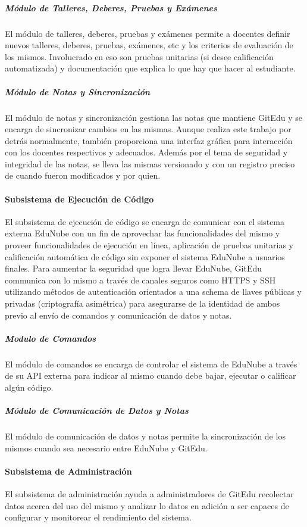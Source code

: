 \subparagraph{Módulo de Talleres, Deberes, Pruebas y Exámenes}
El módulo de talleres, deberes, pruebas y exámenes permite a docentes definir nuevos talleres, deberes, pruebas, exámenes, etc y los criterios de evaluación de los mismos. Involucrado en eso son pruebas unitarias (si desee calificación automatizada) y documentación que explica lo que hay que hacer al estudiante.

\subparagraph{Módulo de Notas y Sincronización}
El módulo de notas y sincronización gestiona las notas que mantiene GitEdu y se encarga de sincronizar cambios en las mismas. Aunque realiza este trabajo por detrás normalmente, también proporciona una interfaz gráfica para interacción con los docentes respectivos y adecuados. Además por el tema de seguridad y integridad de las notas, se lleva las mismas versionado y con un registro preciso de cuando fueron modificados y por quien.

\paragraph{Subsistema de Ejecución de Código}
El subsistema de ejecución de código se encarga de comunicar con el sistema externa EduNube con un fin de aprovechar las funcionalidades del mismo y proveer funcionalidades de ejecución en línea, aplicación de pruebas unitarias y calificación automática de código sin exponer el sistema EduNube a usuarios finales. Para aumentar la seguridad que logra llevar EduNube, GitEdu communica con lo mismo a través de canales seguros como HTTPS y SSH utilizando métodos de autenticación orientados a una schema de llaves públicas y privadas (criptografía asimétrica) para asegurarse de la identidad de ambos previo al envío de comandos y comunicación de datos y notas.

\subparagraph{Modulo de Comandos}
El módulo de comandos se encarga de controlar el sistema de EduNube a través de su API externa para indicar al mismo cuando debe bajar, ejecutar o calificar algún código.

\subparagraph{Módulo de Comunicación de Datos y Notas}
El módulo de comunicación de datos y notas permite la sincronización de los mismos cuando sea necesario entre EduNube y GitEdu.

\paragraph{Subsistema de Administración}
El subsistema de administración ayuda a administradores de GitEdu recolectar datos acerca del uso del mismo y analizar lo datos en adición a ser capaces de configurar y monitorear el rendimiento del sistema.


